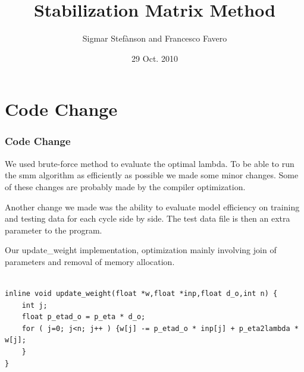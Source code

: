 \documentclass[presentation]{beamer}   %
\begin{document}

\author{Sigmar Stef\`{a}nson and Francesco Favero}
\title{Stabilization Matrix Method}
\date{29 Oct. 2010}



\begin{frame}
  \maketitle
\end{frame}


\section{Code Change}
\begin{frame}
  \frametitle{Code Change}
  \begin{block}\centering
  	We used brute-force method to evaluate the optimal lambda. To be able to run the smm algorithm as efficiently as possible we made some minor changes. Some of these changes are probably made by the compiler optimization.
  \end{block}
   \pause
  \begin{block}\centering
  	Another change we made was the ability to evaluate model efficiency on training and testing data for each cycle side by side. The test data file is then an extra parameter to the program.
  \end{block}
\end{frame}

\begin{frame}
Our update\_weight implementation, optimization mainly involving join of parameters and removal of memory allocation.
 \begin{lstlisting}[basicstyle=\scriptsize,format=C]

inline void update_weight(float *w,float *inp,float d_o,int n) {
	int j;
	float p_etad_o = p_eta * d_o;
	for ( j=0; j<n; j++ ) {w[j] -= p_etad_o * inp[j] + p_eta2lambda * w[j];
	}
}
  \end{lstlisting}
\end{frame}
\end{document}
